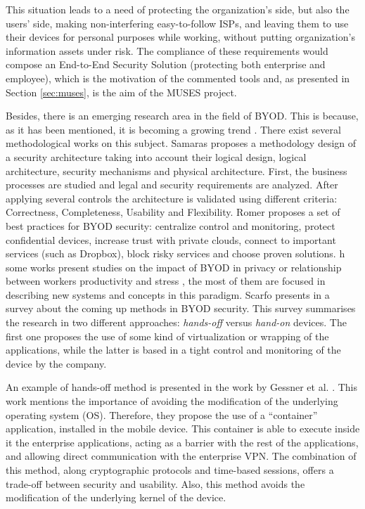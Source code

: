 This situation leads to a need of protecting the organization's side, but also the users' side, making non-interfering easy-to-follow ISPs, and leaving them to use their devices for personal purposes while working, without putting organization's information assets under risk. The compliance of these requirements would compose an End-to-End Security Solution (protecting both enterprise and employee), which is the motivation of the commented tools and, as presented in Section \ref{sec:muses}, is the aim of the MUSES project.

Besides, there is an emerging research area in the field of BYOD. This is because, as it has been mentioned, it is becoming a growing trend \cite{Garba15organisational}. There exist several methodological works on this subject. Samaras \cite{Samaras13SaaS} proposes a methodology design of a security architecture taking into account their logical design, logical architecture, security mechanisms and physical architecture. First, the business processes are studied and legal and security requirements are analyzed. After applying several controls the architecture is validated using different criteria: Correctness, Completeness, Usability and Flexibility. Romer \cite{Romer14BestPractices} proposes a set of best practices for BYOD security: centralize control and monitoring, protect confidential devices, increase trust with private clouds, connect to important services (such as Dropbox), block risky services and choose proven solutions.
h some works present studies on the impact of BYOD in privacy \cite{Miller12Privacy} or relationship between workers productivity and stress \cite{Haejung12Door}, the most of them are focused in describing new systems and concepts in this paradigm. Scarfo presents in \cite{Scarfo12survey} a survey about the coming up methods in BYOD security. This survey summarises the research in two different approaches: {\em hands-off} versus {\em hand-on} devices. The first one proposes the use of some kind of virtualization or wrapping of the applications, while the latter is based in a tight control and monitoring of the device by the company.

An example of hands-off method is presented in the work by Gessner et al. \cite{Gessner13userfriendly}. This work mentions the importance of avoiding the modification of the underlying operating system (OS). Therefore, they propose the use of a ``container'' application, installed in the mobile device. This container is able to execute inside it the enterprise applications, acting as a barrier with the rest of the applications, and allowing direct communication with the enterprise VPN. The combination of this method, along cryptographic protocols and time-based sessions, offers a trade-off between security and usability. Also, this method avoids the modification of the underlying kernel of the device.

